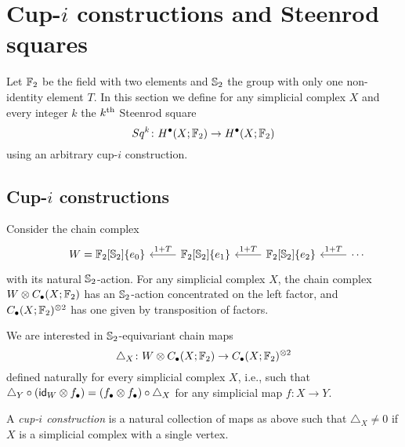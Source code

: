 
\section{Cup-\texorpdfstring{$i$}{i} constructions and Steenrod squares} \label{s:squares}

Let ${\mathbb{F}_2}$ be the field with two elements and $\mathbb{S}_2$ the group with only one non-identity element $T$.
In this section we define for any simplicial complex $X$ and every integer $k$ the $k^{\mathrm{th}}$ Steenrod square
\begin{equation*}
Sq^k \colon H^\bullet(X; {\mathbb{F}_2}) \to H^{\bullet}(X; {\mathbb{F}_2})
\end{equation*}
using an arbitrary cup-$i$ construction.

\subsection{Cup-$i$ constructions}

Consider the chain complex
\begin{equation*}
\begin{tikzcd}[column sep=normal]
& W =  \Ftwo[\Sym_2]\{e_0\} & \arrow[l, "1+T"'] \Ftwo[\Sym_2]\{e_1\} & \arrow[l, "1+T"']
\Ftwo[\Sym_2]\{e_2\} & \arrow[l, "1+T"'] \cdots
\end{tikzcd}
\end{equation*}
with its natural $\mathbb{S}_2$-action.
For any simplicial complex $X$, the chain complex $W \otimes C_\bullet(X; {\mathbb{F}_2})$ has an $\mathbb{S}_2$-action concentrated on the left factor, and $C_\bullet(X; {\mathbb{F}_2})^{\otimes 2}$ has one given by transposition of factors.

We are interested in $\mathbb{S}_2$-equivariant chain maps
\begin{equation} \label{e:steenrod diagonal}
\triangle_X \colon W \otimes C_\bullet(X; {\mathbb{F}_2}) \to C_\bullet(X; {\mathbb{F}_2})^{\otimes 2}
\end{equation}
defined naturally for every simplicial complex $X$, i.e., such that $\triangle_Y \circ (\mathsf{id}_W \otimes f_\bullet) = (f_\bullet \otimes f_\bullet) \circ \triangle_X$ for any simplicial map $f \colon X \to Y$.

\begin{definition}
	A \textit{cup-$i$ construction} is a natural collection of maps as above such that $\triangle_X \neq 0$ if $X$ is a simplicial complex with a single vertex.
\end{definition}

